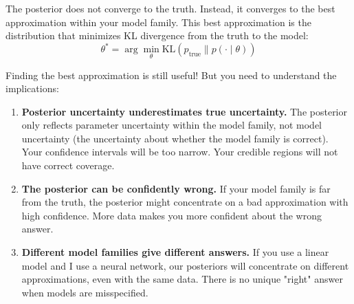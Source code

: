 The posterior does not converge to the truth. Instead, it converges to the best approximation within your model family. This best approximation is the distribution that minimizes KL divergence from the truth to the model:
\begin{equation}
\theta^* = \arg\min_{\theta} \text{KL}(p_{\text{true}} \| p(\cdot \mid \theta))
\end{equation}

Finding the best approximation is still useful! But you need to understand the implications:

\begin{enumerate}
\item \textbf{Posterior uncertainty underestimates true uncertainty.} The posterior only reflects parameter uncertainty within the model family, not model uncertainty (the uncertainty about whether the model family is correct). Your confidence intervals will be too narrow. Your credible regions will not have correct coverage.

\item \textbf{The posterior can be confidently wrong.} If your model family is far from the truth, the posterior might concentrate on a bad approximation with high confidence. More data makes you more confident about the wrong answer.

\item \textbf{Different model families give different answers.} If you use a linear model and I use a neural network, our posteriors will concentrate on different approximations, even with the same data. There is no unique "right" answer when models are misspecified.
\end{enumerate}

\vspace{1.5em}

